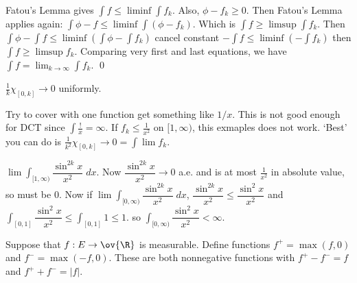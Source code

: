 \pf Fatou's Lemma gives $\int f \leq \liminf \int f_k$. Also, $\phi - f_k \geq 0$. Then Fatou's Lemma applies again: $\int \phi - f \leq \liminf \int (\phi - f_k)$. Which is $\int f \geq \limsup \int f_k$. Then $\int \phi - \int f \leq \liminf (\int \phi - \int f_k)$ cancel constant $-\int f \leq \liminf (-\int f_k)$ then $\int f \geq \limsup f_k$. Comparing very first and last equations, we have $\int f= \lim_{k \to \infty} \int f_k$. \qed \\





\begin{ex}
$\frac{1}{k} \chi_{[0,k]} \to 0$ uniformly. 


Try to cover with one function get something like $1/x$. This is not good enough for DCT since $\int \frac{!}{x}= \infty$. If $f_k \leq \frac{1}{x^2}$ on $[1,\infty)$, this exmaples does not work. `Best' you can do is $\frac{1}{k^2} \chi_{[0,k]} \to 0= \int \lim f_k$. 
\end{ex}


\begin{ex}
$\lim \int_{[1,\infty)} \dfrac{\sin^{2k} x}{x^2} \; dx$. Now $\dfrac{\sin^{2k} x}{x^2} \to 0$ a.e. and is at most $\frac{1}{x^2}$ in absolute value, so must be 0. Now if $\lim \int_{[0,\infty)} \dfrac{\sin^{2k} x}{x^2} \; dx$, $\dfrac{\sin^{2k} x}{x^2} \leq \dfrac{\sin^2 x}{x^2}$ and $\int_{[0,1]} \dfrac{\sin^2 x}{x^2} \leq \int_{[0,1]} 1 \leq 1$. so $\int_{[0,\infty)} \dfrac{\sin^2 x}{x^2}< \infty$.
\end{ex}


















Suppose that $f: E \to \ov{\R}$ is measurable. Define functions $f^+= \max(f,0)$ and $f^-=\max(-f,0)$. These are both nonnegative functions with $f^+ - f^-=f$ and $f^+ + f^-= |f|$. 


